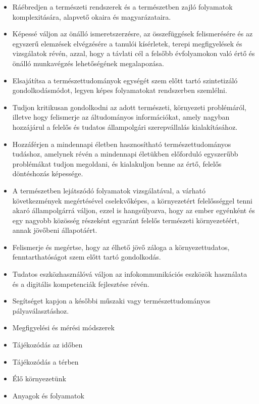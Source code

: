 \begin{itemize}
\item
  Ráébredjen a természeti rendszerek és a természetben zajló folyamatok
  komplexitására, alapvető okaira és magyarázataira.
\item
  Képessé váljon az önálló ismeretszerzésre, az összefüggések
  felismerésére és az egyszerű elemzések elvégzésére a tanulói
  kísérletek, terepi megfigyelések és vizsgálatok révén, azzal, hogy a
  távlati cél a felsőbb évfolyamokon való értő és önálló munkavégzés
  lehetőségének megalapozása.
\item
  Elsajátítsa a természettudományok egységét szem előtt tartó
  szintetizáló gondolkodásmódot, legyen képes folyamatokat rendszerben
  szemlélni.
\item
  Tudjon kritikusan gondolkodni az adott természeti, környezeti
  problémáról, illetve hogy felismerje az áltudományos információkat,
  amely nagyban hozzájárul a felelős és tudatos állampolgári
  szerepvállalás kialakításához.
\item
  Hozzáférjen a mindennapi életben hasznosítható természettudományos
  tudáshoz, amelynek révén a mindennapi életükben előforduló egyszerűbb
  problémákat tudjon megoldani, és kialakuljon benne az értő, felelős
  döntéshozás képessége.
\item
  A természetben lejátszódó folyamatok vizsgálatával, a várható
  következmények megértésével cselekvőképes, a környezetért
  felelősséggel tenni akaró állampolgárrá váljon, ezzel is hangsúlyozva,
  hogy az ember egyénként és egy nagyobb közösség részeként egyaránt
  felelős természeti környezetéért, annak jövőbeni állapotáért.
\item
  Felismerje és megértse, hogy az élhető jövő záloga a környezettudatos,
  fenntarthatóságot szem előtt tartó gondolkodás.
\item
  Tudatos eszközhasználóvá váljon az infokommunikációs eszközök
  használata és a digitális kompetenciák fejlesztése révén.
\item
  Segítséget kapjon a későbbi műszaki vagy természettudományos
  pályaválasztáshoz.
\item
  Megfigyelési és mérési módszerek
\item
  Tájékozódás az időben
\item
  Tájékozódás a térben
\item
  Élő környezetünk
\item
  Anyagok és folyamatok
\end{itemize}

